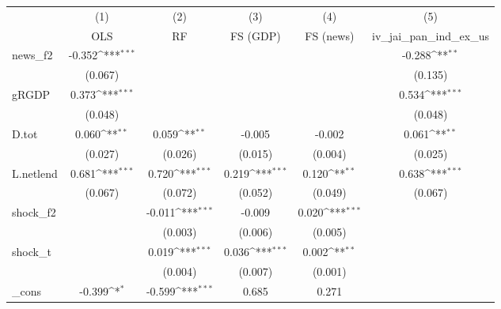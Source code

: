 {
\def\sym#1{\ifmmode^{#1}\else\(^{#1}\)\fi}
\begin{tabular}{l*{5}{c}}
\toprule
            &\multicolumn{1}{c}{(1)}&\multicolumn{1}{c}{(2)}&\multicolumn{1}{c}{(3)}&\multicolumn{1}{c}{(4)}&\multicolumn{1}{c}{(5)}\\
            &\multicolumn{1}{c}{OLS}&\multicolumn{1}{c}{RF}&\multicolumn{1}{c}{FS (GDP)}&\multicolumn{1}{c}{FS (news)}&\multicolumn{1}{c}{iv\_jai\_pan\_ind\_ex\_us}\\
\midrule
news\_f2     &      -0.352\sym{***}&                     &                     &                     &      -0.288\sym{**} \\
            &     (0.067)         &                     &                     &                     &     (0.135)         \\
\addlinespace
gRGDP       &       0.373\sym{***}&                     &                     &                     &       0.534\sym{***}\\
            &     (0.048)         &                     &                     &                     &     (0.048)         \\
\addlinespace
D.tot       &       0.060\sym{**} &       0.059\sym{**} &      -0.005         &      -0.002         &       0.061\sym{**} \\
            &     (0.027)         &     (0.026)         &     (0.015)         &     (0.004)         &     (0.025)         \\
\addlinespace
L.netlend   &       0.681\sym{***}&       0.720\sym{***}&       0.219\sym{***}&       0.120\sym{**} &       0.638\sym{***}\\
            &     (0.067)         &     (0.072)         &     (0.052)         &     (0.049)         &     (0.067)         \\
\addlinespace
shock\_f2    &                     &      -0.011\sym{***}&      -0.009         &       0.020\sym{***}&                     \\
            &                     &     (0.003)         &     (0.006)         &     (0.005)         &                     \\
\addlinespace
shock\_t     &                     &       0.019\sym{***}&       0.036\sym{***}&       0.002\sym{**} &                     \\
            &                     &     (0.004)         &     (0.007)         &     (0.001)         &                     \\
\addlinespace
\_cons      &      -0.399\sym{*}  &      -0.599\sym{***}&       0.685         &       0.271         &                     \\

\end{tabular}}
